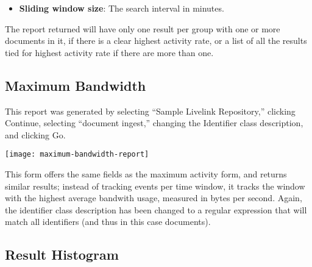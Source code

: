 \begin{changemargin}{1.5in}{0in}
\begin{itemize}
\begin{itemize}

\item \texttt{1(.)}: (up to) Ten groups of documents whose identifier starts
with 1, labeled 0-9, grouped by the second digit of their identifier.

\item \texttt{()}: One group of documents containing all documents 
regardless of identifier.

\item \texttt{17}: One group of documents whose identifier contains
the string ``17.''

\item \texttt{\^{}17}: One group of documents whose identifier \emph{starts}
with the string ``17.''

\end{itemize}

\item \textbf{Sliding window size}: The search interval in minutes.

\end{itemize}

The report returned will have only one result per group with one or more
documents in it, if there is a clear highest activity rate, or a list of
all the results tied for highest activity rate if there are more than one.

\subsection{Maximum Bandwidth}

This report was generated by selecting ``Sample Livelink Repository,''
clicking Continue, selecting ``document ingest,'' changing the Identifier
class description, and clicking Go.

\texttt{[image: maximum-bandwidth-report]}

This form offers the same fields as the maximum activity form, and
returns similar results; instead of tracking events per time window,
it tracks the window with the highest average bandwith usage, measured
in bytes per second. Again, the identifier class description has been
changed to a regular expression that will match all identifiers (and
thus in this case documents).

\subsection{Result Histogram}


\end{changemargin}
